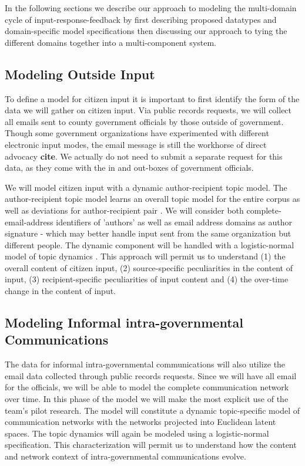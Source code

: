 In the following sections we describe our approach to modeling the multi-domain cycle of input-response-feedback by first describing proposed datatypes and domain-specific model specifications then discussing our approach to tying the different domains together into a multi-component system.

\subsection{Modeling Outside Input}

To define a model for citizen input it is important to first identify the form of the data we will gather on citizen input. Via public records requests, we will collect all emails sent to county government officials by those outside of government. Though some government organizations have experimented with different electronic input modes, the email message is still the workhorse of direct advocacy {\bf cite}. We actually do not need to submit a separate request for this data, as they come with the in and out-boxes of government officials. 

We will model citizen input with a dynamic author-recipient topic model. The author-recipient topic model learns an overall topic model for the entire corpus as well as deviations for author-recipient pair \cite{McCallum2005}. We will consider both complete-email-address identifiers of 'authors' as well as email address domains as author signature - which may better handle input sent from the same organization but different people. The dynamic component will be handled with a logistic-normal model of topic dynamics \cite{Blei2006}. This approach will permit us to understand (1) the overall content of citizen input, (2) source-specific peculiarities in the content of input, (3) recipient-specific peculiarities of input content and (4) the over-time change in the content of input.

\subsection{Modeling Informal intra-governmental Communications}

The data for informal intra-governmental communications will also utilize the email data collected through public records requests. Since we will have all email for the officials, we will be able to model the complete communication network over time. In this phase of the model we will make the most explicit use of the team's pilot research. The model will constitute a dynamic topic-specific model of communication networks with the networks projected into Euclidean latent spaces. The topic dynamics will again be modeled using a logistic-normal specification. This characterization will permit us to understand how the content and network context of intra-governmental communications evolve.

